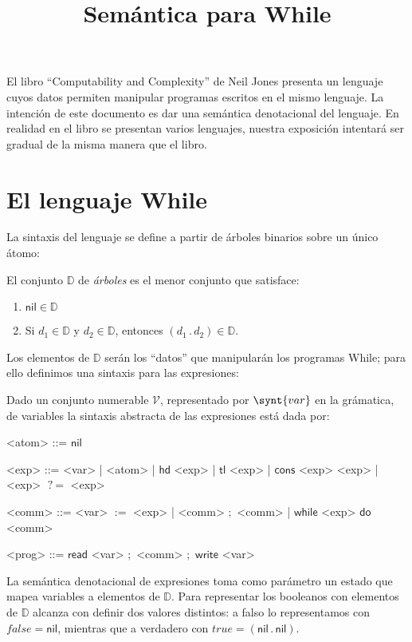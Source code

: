 \documentclass[a4paper,twoside,12pt]{article}
\title{Semántica para While}
\newcommand{\trees}{\mathbb{D}}
\newcommand{\nil}{\mathsf{nil}}
\newcommand{\cons}[2]{(#1\, .\, #2)}
\newcommand{\falseD}{\mathit{false}}
\newcommand{\trueD}{\mathit{true}}
\newcommand{\vars}{\mathcal{V}}
\newcommand{\hd}{\mathsf{hd}}
\newcommand{\tl}{\mathsf{tl}}
\newcommand{\conse}{\mathsf{cons}}
\newcommand{\isEq}{\mathop{?\!\!=}}
\newcommand{\assign}{\mathop{:=}}
\newcommand{\seq}{\mathop{;}}
\newcommand{\whilec}{\mathsf{while}}
\newcommand{\doc}{\mathsf{do}}
\newcommand{\readV}{\mathsf{read}}
\newcommand{\writeV}{\mathsf{write}}
\begin{document}
El libro ``Computability and Complexity'' de Neil
Jones %
presenta un lenguaje cuyos datos permiten manipular programas escritos
en el mismo lenguaje. La intención de este documento es dar una
semántica denotacional del lenguaje. En realidad en el libro se
presentan varios lenguajes, nuestra exposición intentará ser gradual
de la misma manera que el libro.

\section{El lenguaje While}
\label{sec:syntax}

La sintaxis del lenguaje se define a partir de árboles binarios
sobre un único átomo:

\begin{definition}[Árboles]
  El conjunto $\trees$ de \emph{árboles} es el menor conjunto que satisface:
  \begin{enumerate}
  \item $\nil \in \trees$ 
  \item Si $d_1 \in \trees$ y $d_2 \in \trees$, entonces
    $\cons{d_1}{d_2}\in\trees$.
  \end{enumerate}
\end{definition}

Los elementos de $\trees$ serán los ``datos'' que manipularán los
programas While; para ello definimos una sintaxis para las expresiones:

\begin{definition}[Expresiones]
  Dado un conjunto numerable $\vars$, representado por $\synt{var}$ en
  la grámatica, de variables la sintaxis abstracta de las expresiones
  está dada por:
  \begin{grammar}
  <atom> ::= $\nil$

  <exp> ::=  <var> | <atom> | $\hd$ <exp> | $\tl$ <exp> | $\conse$ <exp> <exp> | <exp> $\isEq$ <exp>

  <comm> ::= <var> $\assign$ <exp> 
          | <comm> $\seq$ <comm> 
          | $\whilec$ <exp> $\doc$ <comm> 

  <prog> ::= $\readV$ <var> $\seq$ <comm> $\seq$ $\writeV$ <var>
\end{grammar}
\end{definition}

La semántica denotacional de expresiones toma como parámetro un estado
que mapea variables a elementos de $\trees$. Para representar los
booleanos con elementos de $\trees$ alcanza con definir dos valores
distintos: a falso lo representamos con $\falseD = \nil$, mientras que
a verdadero con $\trueD = \cons \nil \nil$.
\end{document}
